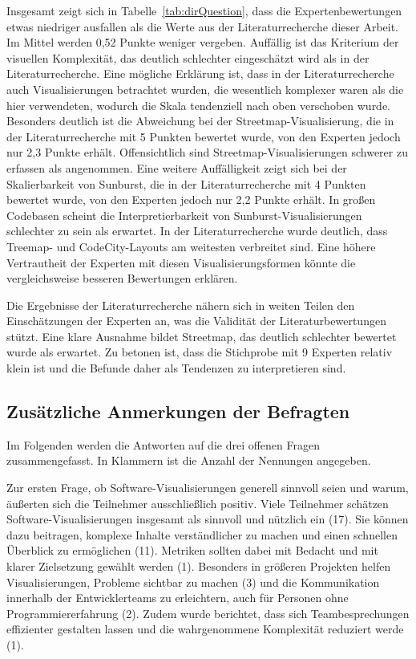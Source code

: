 Insgesamt zeigt sich in Tabelle~\ref{tab:dirQuestion}, dass die Expertenbewertungen etwas niedriger ausfallen als die Werte aus der Literaturrecherche dieser Arbeit. Im Mittel werden 0{,}52 Punkte weniger vergeben. Auffällig ist das Kriterium der visuellen Komplexität, das deutlich schlechter eingeschätzt wird als in der Literaturrecherche. Eine mögliche Erklärung ist, dass in der Literaturrecherche auch Visualisierungen betrachtet wurden, die wesentlich komplexer waren als die hier verwendeten, wodurch die Skala tendenziell nach oben verschoben wurde. Besonders deutlich ist die Abweichung bei der Streetmap-Visualisierung, die in der Literaturrecherche mit 5 Punkten bewertet wurde, von den Experten jedoch nur 2{,}3 Punkte erhält. Offensichtlich sind Streetmap-Visualisierungen schwerer zu erfassen als angenommen. Eine weitere Auffälligkeit zeigt sich bei der Skalierbarkeit von Sunburst, die in der Literaturrecherche mit 4 Punkten bewertet wurde, von den Experten jedoch nur 2{,}2 Punkte erhält. In großen Codebasen scheint die Interpretierbarkeit von Sunburst-Visualisierungen schlechter zu sein als erwartet. In der Literaturrecherche wurde deutlich, dass Treemap- und CodeCity-Layouts am weitesten verbreitet sind. Eine höhere Vertrautheit der Experten mit diesen Visualisierungsformen könnte die vergleichsweise besseren Bewertungen erklären.


Die Ergebnisse der Literaturrecherche nähern sich in weiten Teilen den Einschätzungen der Experten an, was die Validität der Literaturbewertungen stützt. Eine klare Ausnahme bildet Streetmap, das deutlich schlechter bewertet wurde als erwartet. Zu betonen ist, dass die Stichprobe mit 9 Experten relativ klein ist und die Befunde daher als Tendenzen zu interpretieren sind.


\subsection{Zusätzliche Anmerkungen der Befragten} \label{sec:ZusätzlicheAnmerkungen}

Im Folgenden werden die Antworten auf die drei offenen Fragen zusammengefasst. In Klammern ist die Anzahl der Nennungen angegeben.

Zur ersten Frage, ob Software-Visualisierungen generell sinnvoll seien und warum, äußerten sich die Teilnehmer ausschließlich positiv. Viele Teilnehmer schätzen Software-Visualisierungen insgesamt als sinnvoll und nützlich ein (17). Sie können dazu beitragen, komplexe Inhalte verständlicher zu machen und einen schnellen Überblick zu ermöglichen (11). Metriken sollten dabei mit Bedacht und mit klarer Zielsetzung gewählt werden (1). Besonders in größeren Projekten helfen Visualisierungen, Probleme sichtbar zu machen (3) und die Kommunikation innerhalb der Entwicklerteams zu erleichtern, auch für Personen ohne Programmiererfahrung (2). Zudem wurde berichtet, dass sich Teambesprechungen effizienter gestalten lassen und die wahrgenommene Komplexität reduziert werde (1).

